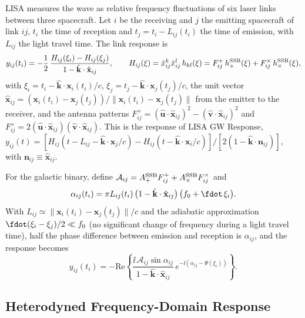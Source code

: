LISA measures the wave as relative frequency fluctuations of six laser links between three
spacecraft. Let $i$ be the receiving and $j$ the emitting spacecraft of link $ij$, $t_i$ the
time of reception and $t_j = t_i - L_{ij}(t_i)$ the time of emission, with $L_{ij}$ the light
travel time. The link response is \citep{finn2009response,cornish2009alternative}
\begin{equation}
  y_{ij}(t_i) = -\frac12\,\frac{H_{ij}(\xi_i) - H_{ij}(\xi_j)}{1 - \hat{\mathbf k}\cdot\hat{\mathbf x}_{ij}},
  \qquad
  H_{ij}(\xi) = \hat x^k_{ij}\hat x^l_{ij}\,h_{kl}(\xi)
  = F^+_{ij}\,h_+^{\rm SSB}(\xi) + F^\times_{ij}\,h_\times^{\rm SSB}(\xi),
  \label{eq:link-response}
\end{equation}
with $\xi_i = t_i - \hat{\mathbf k}\cdot\mathbf x_i(t_i)/c$,
$\xi_j = t_j - \hat{\mathbf k}\cdot\mathbf x_j(t_j)/c$, the unit vector
$\hat{\mathbf x}_{ij} = (\mathbf x_i(t_i) - \mathbf x_j(t_j))/\lVert\mathbf x_i(t_i) - \mathbf x_j(t_j)\rVert$
from the emitter to the receiver, and the antenna patterns
$F^+_{ij} = (\hat{\mathbf u}\cdot\hat{\mathbf x}_{ij})^2 - (\hat{\mathbf v}\cdot\hat{\mathbf x}_{ij})^2$
and $F^\times_{ij} = 2(\hat{\mathbf u}\cdot\hat{\mathbf x}_{ij})(\hat{\mathbf v}\cdot\hat{\mathbf x}_{ij})$.
This is the response of LISA GW Response, $y_{ij}(t) = [H_{ij}(t - L_{ij} - \hat{\mathbf k}\cdot\mathbf x_j/c)
- H_{ij}(t - \hat{\mathbf k}\cdot\mathbf x_i/c)]/[2(1 - \hat{\mathbf k}\cdot\mathbf n_{ij})]$,
with $\mathbf n_{ij}\equiv\hat{\mathbf x}_{ij}$.

For the galactic binary, define
$\mathcal A_{ij} = A_+^{\rm SSB}F^+_{ij} + A_\times^{\rm SSB}F^\times_{ij}$ and
\begin{equation}
  \alpha_{ij}(t_i) = \pi L_{ij}(t_i)\,\bigl(1 - \hat{\mathbf k}\cdot\hat{\mathbf x}_{ij}\bigr)\,
  \bigl(f_0 + \fdot\,\xi_i\bigr).
  \label{eq:alpha}
\end{equation}
With $L_{ij}\simeq\lVert\mathbf x_i(t_i) - \mathbf x_j(t_j)\rVert/c$ and the adiabatic
approximation $\fdot(\xi_i - \xi_j)/2\ll f_0$ (no significant change of frequency during a
light travel time), half the phase difference between emission and reception is
$\alpha_{ij}$, and the response becomes
\begin{equation}
  y_{ij}(t_i) = -\mathrm{Re}\left\{\frac{\ii\,\mathcal A_{ij}\sin\alpha_{ij}}
  {1 - \hat{\mathbf k}\cdot\hat{\mathbf x}_{ij}}\,
  e^{-\ii\left(\alpha_{ij} - \Psi(\xi_i)\right)}\right\}.
  \label{eq:link-gb}
\end{equation}

\subsection{Heterodyned Frequency-Domain Response}
\label{app:signal-heterodyne}

